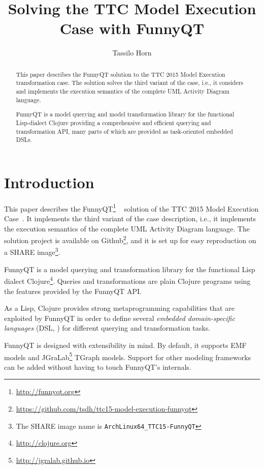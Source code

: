 \documentclass[submission]{eptcs}
\title{Solving the TTC Model Execution Case with FunnyQT}
\author{Tassilo Horn
  \institute{Institute for Software Technology, University Koblenz-Landau, Germany}
  \email{horn@uni-koblenz.de}}
\begin{document}
\maketitle

\begin{abstract}
  This paper describes the FunnyQT solution to the TTC 2015 Model Execution
  transformation case.  The solution solves the third variant of the case,
  i.e., it considers and implements the execution semantics of the complete UML
  Activity Diagram language.

  FunnyQT is a model querying and model transformation library for the
  functional Lisp-dialect Clojure providing a comprehensive and efficient
  querying and transformation API, many parts of which are provided as
  task-oriented embedded DSLs.
\end{abstract}


\section{Introduction}
\label{sec:introduction}

This paper describes the FunnyQT\footnote{\url{http://funnyqt.org}}
~\cite{Horn2013MQWFQ,funnyqt-icgt15} solution of the TTC 2015 Model Execution
Case~\cite{model-execution-case-desc}.  It implements the third variant of the
case description, i.e., it implements the execution semantics of the complete
UML Activity Diagram language.  The solution project is available on
Github\footnote{\url{https://github.com/tsdh/ttc15-model-execution-funnyqt}},
and it is set up for easy reproduction on a SHARE image\footnote{The SHARE
  image name is \verb|ArchLinux64_TTC15-FunnyQT|}.

FunnyQT is a model querying and transformation library for the functional Lisp
dialect Clojure\footnote{\url{http://clojure.org}}.  Queries and
transformations are plain Clojure programs using the features provided by the
FunnyQT API.

As a Lisp, Clojure provides strong metaprogramming capabilities that are
exploited by FunnyQT in order to define several \emph{embedded domain-specific
  languages} (DSL, \cite{book:Fowler2010DSL}) for different querying and
transformation tasks.

FunnyQT is designed with extensibility in mind.  By default, it supports EMF
\cite{Steinberg2008EEM} models and
JGraLab\footnote{\url{http://jgralab.github.io}} TGraph models.  Support for
other modeling frameworks can be added without having to touch FunnyQT's
internals.
\end{document}

